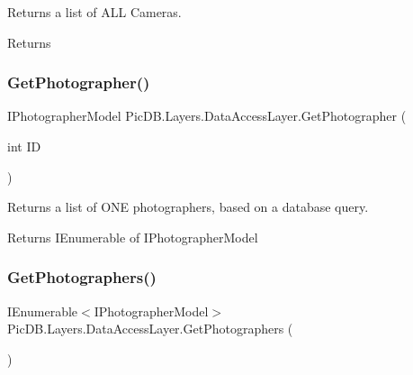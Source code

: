 Returns a list of A\+LL Cameras. 

\begin{DoxyReturn}{Returns}

\end{DoxyReturn}
\mbox{\label{class_pic_d_b_1_1_layers_1_1_data_access_layer_a1a5096b0ee7c2e9c8a051af5f74ad2ec}} 
\subsubsection{\texorpdfstring{Get\+Photographer()}{GetPhotographer()}}
{\footnotesize\ttfamily I\+Photographer\+Model Pic\+D\+B.\+Layers.\+Data\+Access\+Layer.\+Get\+Photographer (\begin{DoxyParamCaption}\item[{int}]{ID }\end{DoxyParamCaption})}



Returns a list of O\+NE photographers, based on a database query. 

\begin{DoxyReturn}{Returns}
I\+Enumerable of I\+Photographer\+Model
\end{DoxyReturn}
\mbox{\label{class_pic_d_b_1_1_layers_1_1_data_access_layer_a41fdea4749eb2ff6826099bae90d0620}} 
\subsubsection{\texorpdfstring{Get\+Photographers()}{GetPhotographers()}}
{\footnotesize\ttfamily I\+Enumerable$<$I\+Photographer\+Model$>$ Pic\+D\+B.\+Layers.\+Data\+Access\+Layer.\+Get\+Photographers (\begin{DoxyParamCaption}{ }\end{DoxyParamCaption})}




